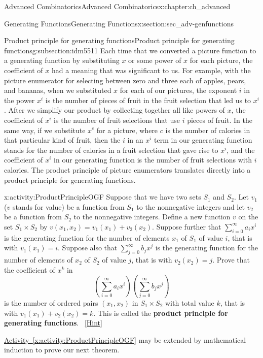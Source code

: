 \documentclass[oneside,10pt,]{book}
\newcommand{\terminology}[1]{\textbf{#1}}
\numberwithin{equation}{chapter}
\begin{document}
\begin{chapterptx}{Advanced Combinatorics}{}{Advanced Combinatorics}{}{}{x:chapter:ch_advanced}
\begin{sectionptx}{Generating Functions}{}{Generating Functions}{}{}{x:section:sec_adv-genfunctions}
\begin{subsectionptx}{Product principle for generating functions}{}{Product principle for generating functions}{}{}{g:subsection:idm5511}
Each time that we converted a picture function to a generating function by substituting \(x\) or some power of \(x\) for each picture, the coefficient of \(x\) had a meaning that was significant to us. For example, with the picture enumerator for selecting between zero and three each of apples, pears, and bananas, when we substituted \(x\) for each of our pictures, the exponent \(i\) in the power \(x^i\) is the number of pieces of fruit in the fruit selection that led us to \(x^i\). After we simplify our product by collecting together all like powers of \(x\), the coefficient of \(x^i\) is the number of fruit selections that use \(i\) pieces of fruit. In the same way, if we substitute \(x^c\) for a picture, where \(c\) is the number of calories in that particular kind of fruit, then the \(i\) in an \(x^i\) term in our generating function stands for the number of calories in a fruit selection that gave rise to \(x^i\), and the coefficient of \(x^i\) in our generating function is the number of fruit selections with \(i\) calories.  The product principle of picture enumerators translates directly into a product principle for generating functions.%
\begin{activity}{}{x:activity:ProductPrincipleOGF}%
Suppose that we have two sets \(S_1\) and \(S_2\). Let \(v_1\) (\(v\) stands for value) be a function from \(S_1\) to the nonnegative integers and let \(v_2\) be a function from \(S_2\) to the nonnegative integers.  Define a new function \(v\) on the set \(S_1 \times S_2\) by \(v(x_1,x_2) = v_1(x_1) +v_2(x_2)\). Suppose further that \(\sum_{i=0}^\infty a_ix^i\) is the generating function for the number of elements \(x_1\) of \(S_1\) of value \(i\), that is with \(v_1(x_1)=i\). Suppose also that \(\sum_{j=0}^\infty b_j x^j\) is the generating function for the number of elements of \(x_2\) of \(S_2\) of value \(j\), that is with \(v_2(x_2) = j\).  Prove that the coefficient of \(x^k\) in%
\begin{equation*}
\left(\sum_{i=0}^\infty a_ix^i\right)\left(\sum_{j=0}^\infty
b_jx^j\right)
\end{equation*}
is the number of ordered pairs \((x_1,x_2)\) in \(S_1\times S_2\) with total value \(k\), that is with \(v_1(x_1) +v_2(x_2) =k\). This is called the \terminology{product principle for generating functions}.%
\qquad~\hfill{\tiny\hyperlink{g:hint:idm5566-back}{[Hint]}}\end{activity}
\hyperref[x:activity:ProductPrincipleOGF]{Activity~\ref{x:activity:ProductPrincipleOGF}} may be extended by mathematical induction to prove our next theorem.%

\end{subsectionptx}
\end{sectionptx}
\end{chapterptx}
\end{document}
